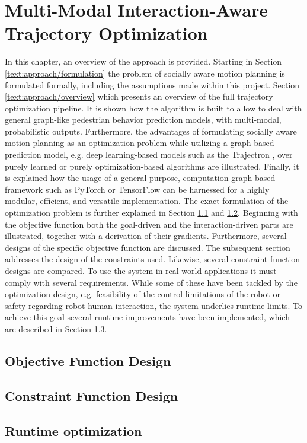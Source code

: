 \chapter{Multi-Modal Interaction-Aware Trajectory Optimization}
\label{text:approach}
In this chapter, an overview of the approach is provided. Starting in Section \ref{text:approach/formulation} the problem of socially aware motion planning is formulated formally, including the assumptions made within this project. 
\newline
Section \ref{text:approach/overview} which presents an overview of the full trajectory optimization pipeline. It is shown how the algorithm is built to allow to deal with general graph-like pedestrian behavior prediction models, with multi-modal, probabilistic outputs. Furthermore, the advantages of formulating socially aware motion planning as an optimization problem while utilizing a graph-based prediction model, e.g. deep learning-based models such as the Trajectron \cite{Ivanovic18}, over purely learned \cite{Chen2017} or purely optimization-based \cite{Berg2011} algorithms are illustrated. Finally, it is explained how the usage of a general-purpose, computation-graph based framework such as PyTorch \cite{pytorch} or TensorFlow \cite{tensorflow} can be harnessed for a highly modular, efficient, and versatile implementation.
\newline
The exact formulation of the optimization problem is further explained in Section \ref{text:approach/objective} and \ref{text:approach/constraint}. Beginning with the objective function both the goal-driven and the interaction-driven parts are illustrated, together with a derivation of their gradients. Furthermore, several designs of the specific objective function are discussed. The subsequent section addresses the design of the constraints used. Likewise, several constraint function designs are compared. 
\newline
To use the system in real-world applications it must comply with several requirements. While some of these have been tackled by the optimization design, e.g. feasibility of the control limitations of the robot or safety regarding robot-human interaction, the system underlies runtime limits. To achieve this goal several runtime improvements have been implemented, which are described in Section \ref{text:approach/runtime}.




\section{Objective Function Design}
\label{text:approach/objective}




\section{Constraint Function Design}
\label{text:approach/constraint}




\section{Runtime optimization}
\label{text:approach/runtime}



